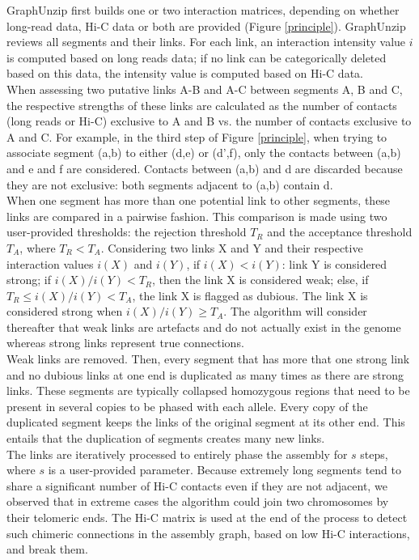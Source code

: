 GraphUnzip first builds one or two interaction matrices, depending on whether long-read data, Hi-C data or both are provided (Figure \ref{principle}). GraphUnzip reviews all segments and their links. For each link, an interaction intensity value $i$ is computed based on long reads data; if no link can be categorically deleted based on this data, the intensity value is computed based on Hi-C data. \\

When assessing two putative links A-B and A-C between segments A, B and C, the respective strengths of these links are calculated as the number of contacts (long reads or Hi-C) exclusive to A and B vs. the number of contacts exclusive to A and C. For example, in the third step of Figure \ref{principle}, when trying to associate segment (a,b) to either (d,e) or (d',f), only the contacts between (a,b) and e and f are considered. Contacts between (a,b) and d are discarded because they are not exclusive: both segments adjacent to (a,b) contain d.\\

When one segment has more than one potential link to other segments, these links are compared in a pairwise fashion. This comparison is made using two user-provided thresholds: the rejection threshold $T_R$ and the acceptance threshold $T_A$, where $T_R < T_A$. Considering two links X and Y and their respective interaction values $i(X)$ and $i(Y)$, if $i(X) < i(Y)$: link Y is considered strong; if $i(X)/i(Y) < T_R$, then the link X is considered weak; else, if $T_R \le i(X)/i(Y) < T_A$, the link X is flagged as dubious. The link X is considered strong when $i(X)/i(Y) \ge T_A$. The algorithm will consider thereafter that weak links are artefacts and do not actually exist in the genome whereas strong links represent true connections. \\

Weak links are removed. Then, every segment that has more that one strong link and no dubious links at one end is duplicated as many times as there are strong links. These segments are typically collapsed homozygous regions that need to be present in several copies to be phased with each allele. Every copy of the duplicated segment keeps the links of the original segment at its other end. This entails that the duplication of segments creates many new links. \\

The links are iteratively processed to entirely phase the assembly for $s$ steps, where $s$ is a user-provided parameter. Because extremely long segments tend to share a significant number of Hi-C contacts even if they are not adjacent, we observed that in extreme cases the algorithm could join two chromosomes by their telomeric ends. The Hi-C matrix is used at the end of the process to detect such chimeric connections in the assembly graph, based on low Hi-C interactions, and break them. \\

